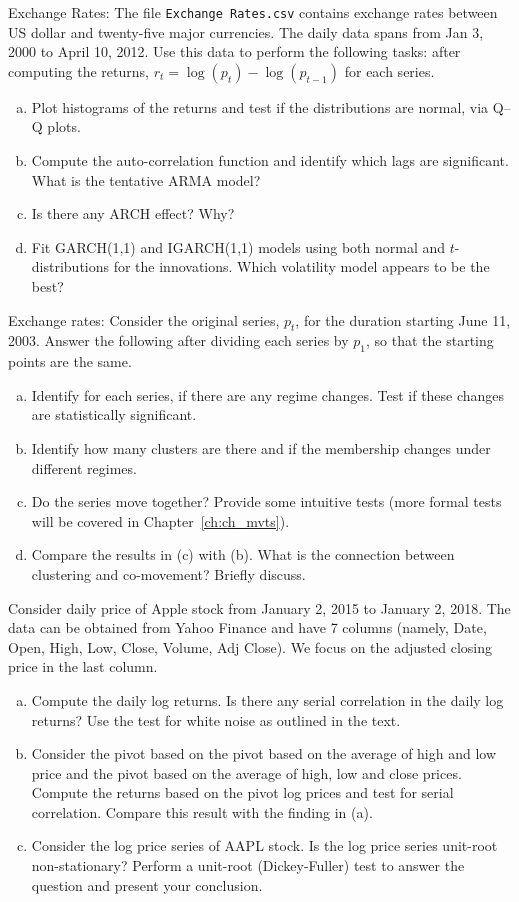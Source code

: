 \prob Exchange Rates: The file \texttt{Exchange Rates.csv} contains exchange rates between US dollar and twenty-five major currencies. The daily data spans from Jan 3, 2000 to April 10, 2012. Use this data to perform the following tasks: after computing the returns, $r_t=\log(p_t)-\log(p_{t-1})$ for each series.

\begin{enumerate}[(a)]
\item Plot histograms of the returns and test if the distributions are normal, via Q--Q plots.
\item Compute the auto-correlation function and identify which lags are significant. What is the tentative ARMA model?
\item Is there any ARCH effect? Why?
\item Fit GARCH(1,1) and IGARCH(1,1) models using both normal and $t$-distributions for the innovations. Which volatility model appears to be the best? \twomedskip
\end{enumerate}


\prob Exchange rates: Consider the original series, $p_t$, for the duration starting June 11, 2003.
 Answer the following after dividing each series by $p_1$, so that the starting points are the same.
 
\begin{enumerate}[(a)]
\item Identify for each series, if there are any regime changes. Test if these changes are statistically significant.
\item Identify how many clusters are there and if the membership changes under different regimes.
\item Do the series move together? Provide some intuitive tests (more formal tests will be covered in Chapter~\ref{ch:ch_mvts}). 
\item Compare the results in (c) with (b). What is the connection between clustering and co-movement? Briefly discuss. \twomedskip
\end{enumerate}


\prob Consider daily price of Apple stock from January 2, 2015 to January 2, 2018. The data can be obtained from Yahoo Finance and have 7 columns (namely, Date, Open, High, Low, Close, Volume, Adj Close). We focus on the adjusted closing price in the last column.

\begin{enumerate}[(a)]
\item Compute the daily log returns. Is there any serial correlation in the daily log returns? Use the test for white noise as outlined in the text. 
\item Consider the pivot based on the pivot based on the average of high and low price and the pivot based on the average of high, low and close prices. Compute the returns based on the pivot log prices and test for serial correlation. Compare this result with the finding in (a). 
\item Consider the log price series of AAPL stock. Is the log price series unit-root non-stationary? Perform a unit-root (Dickey-Fuller) test to answer the question and present your conclusion. \twomedskip
\end{enumerate}


